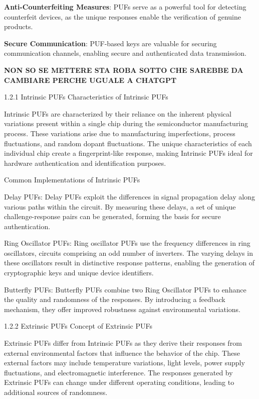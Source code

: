 \documentclass{article}
\begin{document}
\textbf{Anti-Counterfeiting Measures}: PUFs serve as a powerful tool for detecting counterfeit devices, as the unique responses enable the verification of genuine products.


\textbf{Secure Communication}: PUF-based keys are valuable for securing communication channels, enabling secure and authenticated data transmission.


\textbf{NON SO SE METTERE STA ROBA SOTTO CHE SAREBBE DA CAMBIARE PERCHE UGUALE A CHATGPT}


1.2.1 Intrinsic PUFs
Characteristics of Intrinsic PUFs

Intrinsic PUFs are characterized by their reliance on the inherent physical variations present within a single chip during the semiconductor manufacturing process. These variations arise due to manufacturing imperfections, process fluctuations, and random dopant fluctuations. The unique characteristics of each individual chip create a fingerprint-like response, making Intrinsic PUFs ideal for hardware authentication and identification purposes.

Common Implementations of Intrinsic PUFs

Delay PUFs: Delay PUFs exploit the differences in signal propagation delay along various paths within the circuit. By measuring these delays, a set of unique challenge-response pairs can be generated, forming the basis for secure authentication.

Ring Oscillator PUFs: Ring oscillator PUFs use the frequency differences in ring oscillators, circuits comprising an odd number of inverters. The varying delays in these oscillators result in distinctive response patterns, enabling the generation of cryptographic keys and unique device identifiers.

Butterfly PUFs: Butterfly PUFs combine two Ring Oscillator PUFs to enhance the quality and randomness of the responses. By introducing a feedback mechanism, they offer improved robustness against environmental variations.


1.2.2 Extrinsic PUFs
Concept of Extrinsic PUFs

Extrinsic PUFs differ from Intrinsic PUFs as they derive their responses from external environmental factors that influence the behavior of the chip. These external factors may include temperature variations, light levels, power supply fluctuations, and electromagnetic interference. The responses generated by Extrinsic PUFs can change under different operating conditions, leading to additional sources of randomness.
\end{document}
